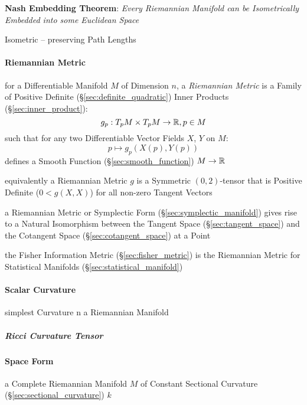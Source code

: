 \textbf{Nash Embedding Theorem}: \emph{Every Riemannian Manifold can be
  Isometrically Embedded into some Euclidean Space}

Isometric -- preserving Path Lengths



\paragraph{Riemannian Metric}\label{sec:riemannian_metric}\hfill

for a Differentiable Manifold $M$ of Dimension $n$, a \emph{Riemannian
  Metric} is a Family of Positive Definite
(\S\ref{sec:definite_quadratic}) Inner Products
(\S\ref{sec:inner_product}):
\[
  g_p : T_p M \times T_p M \rightarrow \mathbb{R}, p \in M
\]
such that for any two Differentiable Vector Fields $X$, $Y$ on $M$:
\[
  p \mapsto g_p (X(p), Y(p))
\]
defines a Smooth Function (\S\ref{sec:smooth_function}) $M \rightarrow
\mathbb{R}$

equivalently a Riemannian Metric $g$ is a Symmetric $(0,2)$-tensor
that is Positive Definite ($0 < g(X,X)$) for all non-zero Tangent
Vectors %

a Riemannian Metric or Symplectic Form (\S\ref{sec:symplectic_manifold}) gives
rise to a Natural Isomorphism between the Tangent Space
(\S\ref{sec:tangent_space}) and the Cotangent Space
(\S\ref{sec:cotangent_space}) at a Point

the Fisher Information Metric (\S\ref{sec:fisher_metric}) is the Riemannian
Metric for Statistical Manifolds (\S\ref{sec:statistical_manifold})



\paragraph{Scalar Curvature}\label{sec:scalar_curvature}\hfill

simplest Curvature n a Riemannian Manifold



\subparagraph{Ricci Curvature Tensor}\label{sec:ricci_curvature}\hfill



\paragraph{Space Form}\label{sec:space_form}\hfill

a Complete Riemannian Manifold $M$ of Constant Sectional Curvature
(\S\ref{sec:sectional_curvature}) $k$

